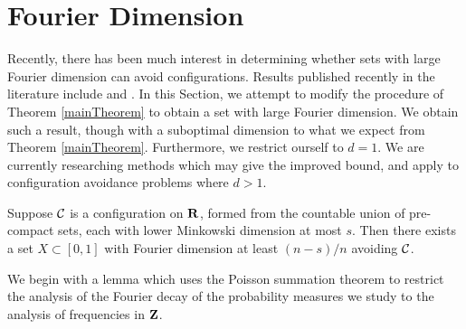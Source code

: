 \section{Fourier Dimension}

Recently, there has been much interest in determining whether sets with large Fourier dimension can avoid configurations. Results published recently in the literature include \cite{PramanikLaba} and \cite{Shmerkin}. In this Section, we attempt to modify the procedure of Theorem \ref{mainTheorem} to obtain a set with large Fourier dimension. We obtain such a result, though with a suboptimal dimension to what we expect from Theorem \ref{mainTheorem}. Furthermore, we restrict ourself to $d = 1$. We are currently researching methods which may give the improved bound, and apply to configuration avoidance problems where $d > 1$.

\begin{theorem} \label{FourierTheorem}
    Suppose $\operatorname{\mathcal{C}}$ is a configuration on $\operatorname{\mathbf{R}}$, formed from the countable union of pre-compact sets, each with lower Minkowski dimension at most $s$. Then there exists a set $X \subset [0,1]$ with Fourier dimension at least $(n - s)/n$ avoiding $\operatorname{\mathcal{C}}$.
\end{theorem}

We begin with a lemma which uses the Poisson summation theorem to restrict the analysis of the Fourier decay of the probability measures we study to the analysis of frequencies in $\operatorname{\mathbf{Z}}$.

